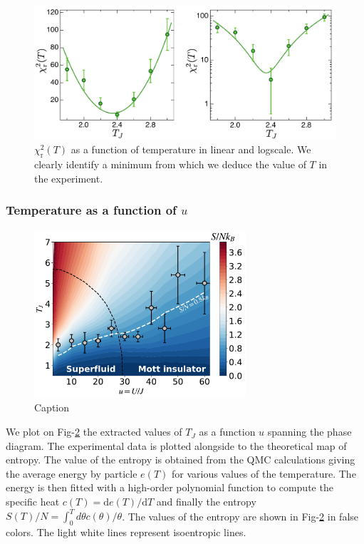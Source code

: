 \begin{figure}
    \centering
    \includegraphics[width=1\textwidth]{Fig/Chapter3/chi_square.pdf}
    \caption{ $\chi_{\mathrm{r}}^{2}(T)$ as a function of temperature in linear and logscale. We clearly identify a minimum from which we deduce the value of $T$ in the experiment.}
    \label{fig:chi_vs_T}
\end{figure}

\subsubsection{Temperature as a function of $u$}

\begin{figure}
    \centering
    \includegraphics[width=0.7\textwidth]{Fig/Chapter3/T_vs_s.pdf}
    \caption{Caption}
    \label{fig:T_vs_u}
\end{figure}

We plot on Fig-\ref{fig:T_vs_u} the extracted values of $T_J$ as a function $u$ spanning the phase diagram. The experimental data is plotted alongside to the theoretical map of entropy. The value of the entropy is obtained from the QMC calculations giving the average energy by particle $e(T)$ for various values of the temperature. The energy is then fitted with a high-order polynomial function to compute the specific heat $c(T)=\mathrm{d} e(T) / \mathrm{d} T$ and finally the entropy $S(T) / N=\int_{0}^{T} d \theta c(\theta) / \theta$. The values of the entropy are shown in Fig-\ref{fig:T_vs_u} in false colors. The light white lines represent isoentropic lines. 

